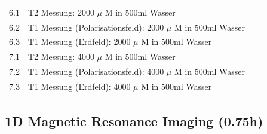 \begin{tabular}{ll}
           6.1 & T2 Messung: 2000 $\mu$ M in 500ml Wasser \\
    
           6.2 & T1 Messung (Polarisationsfeld): 2000 $\mu$ M in 500ml Wasser \\
    
           6.3 & T1 Messung (Erdfeld): 2000 $\mu$ M in 500ml Wasser \\
    
           7.1 & T2 Messung: 4000 $\mu$ M in 500ml Wasser \\
    
           7.2 & T1 Messung (Polarisationsfeld): 4000 $\mu$ M in 500ml Wasser \\
    
           7.3 & T1 Messung (Erdfeld): 4000 $\mu$ M in 500ml Wasser \\
    
    \end{tabular}  
     
    
    \subsection{1D Magnetic Resonance Imaging (0.75h)}



